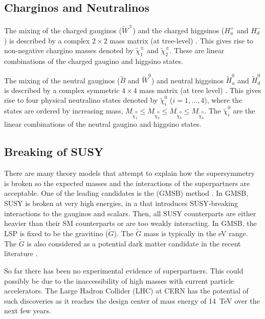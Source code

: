 \subsection{Charginos and Neutralinos}
The mixing of the charged gauginos ($\widetilde{W}^{\pm}$) and the charged higgsinos ($H_{u}^{+}$ and $H_{d}^{-}$) is described by a complex $2\times2$ mass matrix (at tree-level) \cite{pap:SUSYCharginoMasses1, pap:SUSYCharginoMasses2}. This gives rise to non-negative chargino masses denoted by $\widetilde{\chi}^{\pm}_{1}$ and $\widetilde{\chi}^{\pm}_{2}$. These are linear combinations of the charged gaugino and higgsino states.

The mixing of the neutral gauginos ($\widetilde{B}$ and $\widetilde{W}^{0}$) and neutral higgsinos $\widetilde{H}_{u}^{0}$ and $\widetilde{H}_{d}^{0}$ is described by a complex symmetric $4\times4$ mass matrix (at tree level) \cite{pap:SUSYCharginoMasses1, pap:SUSYGauginoMasses1, pap:SUSYGauginoMasses2}. This gives rise to four physical neutralino states denoted by $\widetilde\chi_{i}^{0}$ ($i=1,..., 4$), where the states are ordered by increasing mass, $M_{\widetilde\chi_{1}^{0}} \leq M_{\widetilde\chi_{2}^{0}} \leq M_{\widetilde\chi_{3}^{0}} \leq M_{\widetilde\chi_{4}^{0}}$. The $\widetilde\chi_{i}^{0}$ are the linear combinations of the neutral gaugino and higgsino states.

\subsection{Breaking of SUSY}
There are many theory models that attempt to explain how the supersymmetry is broken so the expected masses and the interactions of the superpartners are acceptable. One of the leading candidates is the  (GMSB) method \cite{ pap:SUSY_SMartin, pap:SUSY_MDine1993}. In GMSB, SUSY is broken at very high energies, in a  that introduces SUSY-breaking interactions to the  gauginos and scalars. Then, all SUSY counterparts are either heavier than their SM counterparts or are too weakly interacting.
In GMSB, the LSP is fixed to be the gravitino ($\widetilde{G}$). The $\widetilde{G}$ mass is typically in the eV range. The $\widetilde{G}$ is also considered as a potential dark matter candidate in the recent literature \cite{pap:DarkMatterCandidates}.

So far there has been no experimental evidence of superpartners. This could possibly be due to the inaccessibility of high masses with current particle accelerators. The Large Hadron Collider (LHC) at CERN has the potential of such discoveries as it reaches the design center of mass energy of 14~TeV over the next few years.

